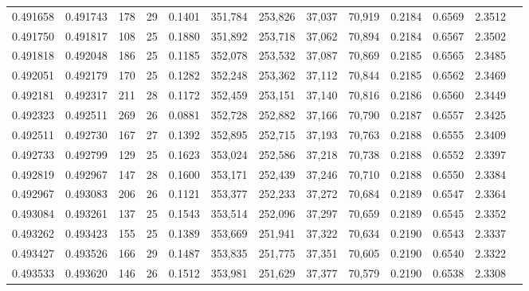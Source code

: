 \begin{tabular}{rrrrrrrrrrrrr}
0.491658 & 0.491743 &   178 &  29 &                                     0.1401 & 351,784 & 253,826 &  37,037 &  70,919 & 0.2184 & 0.6569 & 2.3512 \\
0.491750 & 0.491817 &   108 &  25 &                                     0.1880 & 351,892 & 253,718 &  37,062 &  70,894 & 0.2184 & 0.6567 & 2.3502 \\
0.491818 & 0.492048 &   186 &  25 &                                     0.1185 & 352,078 & 253,532 &  37,087 &  70,869 & 0.2185 & 0.6565 & 2.3485 \\
0.492051 & 0.492179 &   170 &  25 &                                     0.1282 & 352,248 & 253,362 &  37,112 &  70,844 & 0.2185 & 0.6562 & 2.3469 \\
0.492181 & 0.492317 &   211 &  28 &                                     0.1172 & 352,459 & 253,151 &  37,140 &  70,816 & 0.2186 & 0.6560 & 2.3449 \\
0.492323 & 0.492511 &   269 &  26 &                                     0.0881 & 352,728 & 252,882 &  37,166 &  70,790 & 0.2187 & 0.6557 & 2.3425 \\
0.492511 & 0.492730 &   167 &  27 &                                     0.1392 & 352,895 & 252,715 &  37,193 &  70,763 & 0.2188 & 0.6555 & 2.3409 \\
0.492733 & 0.492799 &   129 &  25 &                                     0.1623 & 353,024 & 252,586 &  37,218 &  70,738 & 0.2188 & 0.6552 & 2.3397 \\
0.492819 & 0.492967 &   147 &  28 &                                     0.1600 & 353,171 & 252,439 &  37,246 &  70,710 & 0.2188 & 0.6550 & 2.3384 \\
0.492967 & 0.493083 &   206 &  26 &                                     0.1121 & 353,377 & 252,233 &  37,272 &  70,684 & 0.2189 & 0.6547 & 2.3364 \\
0.493084 & 0.493261 &   137 &  25 &                                     0.1543 & 353,514 & 252,096 &  37,297 &  70,659 & 0.2189 & 0.6545 & 2.3352 \\
0.493262 & 0.493423 &   155 &  25 &                                     0.1389 & 353,669 & 251,941 &  37,322 &  70,634 & 0.2190 & 0.6543 & 2.3337 \\
0.493427 & 0.493526 &   166 &  29 &                                     0.1487 & 353,835 & 251,775 &  37,351 &  70,605 & 0.2190 & 0.6540 & 2.3322 \\
0.493533 & 0.493620 &   146 &  26 &                                     0.1512 & 353,981 & 251,629 &  37,377 &  70,579 & 0.2190 & 0.6538 & 2.3308 \\

\end{tabular}
